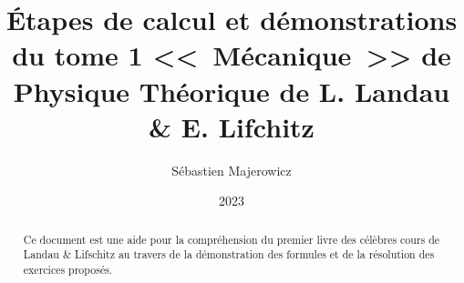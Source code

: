 \documentclass[12pt,a4paper]{report}
\title{\'Etapes de calcul et d\'emonstrations du tome 1 <<~M\'ecanique~>>  de Physique Th\'eorique de L. Landau \&  E. Lifchitz}
\author{S\'ebastien Majerowicz}
\date{2023}
\begin{document}
\maketitle

\begin{abstract}
Ce document est une aide pour la compr\'ehension du premier livre des célèbres cours de Landau \& Lifschitz au travers de la démonstration des formules et de la résolution des exercices propos\'es.
\end{abstract}

\tableofcontents
\listoffigures

\clearpage
{}
\setcounter{page}{1}





\appendix




\end{document}

